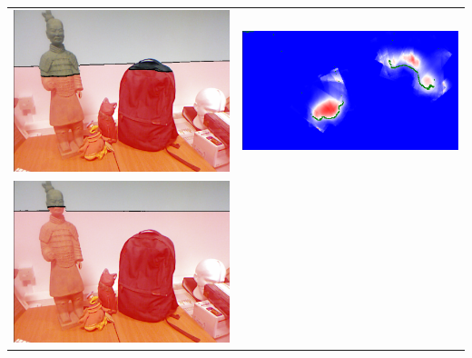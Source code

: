 \documentclass[10pt,onecolumn,letterpaper]{article}
\begin{document}
\begin{tabular}{cc}
\includegraphics[height=\imheight]{real/statue/rgb_00150.png} &
\includegraphics[height=\imheight]{real/statue/slice_00150.png} \\
\includegraphics[height=\imheight]{real/statue/rgb_00200.png} &

\end{tabular}
\end{document}
